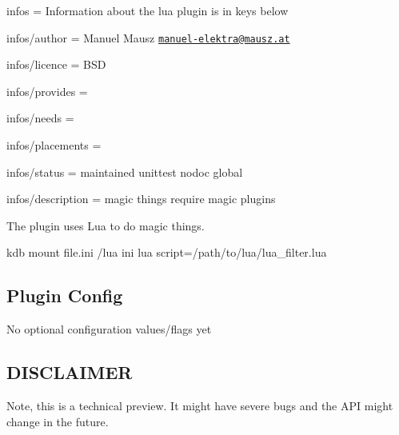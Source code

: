 
\begin{DoxyItemize}
\item infos = Information about the lua plugin is in keys below
\item infos/author = Manuel Mausz \href{mailto:manuel-elektra@mausz.at}{\tt manuel-\/elektra@mausz.\+at}
\item infos/licence = B\+S\+D
\item infos/provides =
\item infos/needs =
\item infos/placements =
\item infos/status = maintained unittest nodoc global
\item infos/description = magic things require magic plugins
\end{DoxyItemize}

The plugin uses Lua to do magic things.

\begin{DoxyVerb}kdb mount file.ini /lua ini lua script=/path/to/lua/lua_filter.lua
\end{DoxyVerb}


\subsection*{Plugin Config}

No optional configuration values/flags yet

\subsection*{D\+I\+S\+C\+L\+A\+I\+M\+E\+R}

Note, this is a technical preview. It might have severe bugs and the A\+P\+I might change in the future. 